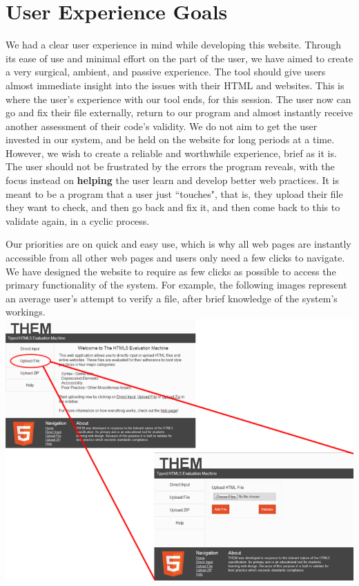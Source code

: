 \documentclass[10pt]{article}
\begin{document}
\newpage

\section*{User Experience Goals}

We had a clear user experience in mind while developing this website. Through its ease of use and minimal effort on the part of the user, we have aimed to create a very surgical, ambient, and passive experience. The tool should give users almost immediate insight into the issues with their HTML and websites. This is where the user's experience with our tool ends, for this session. The user now can go and fix their file externally, return to our program and almost instantly receive another assessment of their code's validity. We do not aim to get the user invested in our system, and be held on the website for long periods at a time. However, we wish to create a reliable and worthwhile experience, brief as it is. The user should not be frustrated by the errors the program reveals, with the focus instead on \textbf{helping} the user learn and develop better web practices. It is meant to be a program that a user just ``touches", that is, they upload their file they want to check, and then go back and fix it, and then come back to this to validate again, in a cyclic process.

Our priorities are on quick and easy use, which is why all web pages are instantly accessible from all other web pages and users only need a few clicks to navigate. We have designed the website to require as few clicks as possible to access the primary functionality of the system. For example, the following images represent an average user's attempt to verify a file, after brief knowledge of the system's workings. \\

\includegraphics[scale=0.5]{click1.png}
\end{document}
